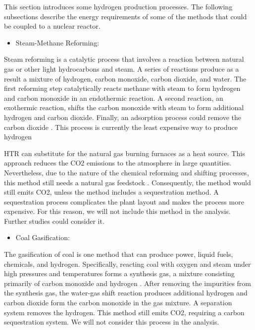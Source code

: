 \documentclass[11pt,letterpaper]{article}
\begin{document}
This section introduces some hydrogen production processes.
The following subsections describe the energy requirements of some of the methods that could be coupled to a nuclear reactor.

\begin{itemize}
	\item Steam-Methane Reforming:
\end{itemize}

Steam reforming is a catalytic process that involves a reaction between natural gas or other light hydrocarbons and steam.
A series of reactions produce as a result a mixture of hydrogen, carbon monoxide, carbon
dioxide, and water.
The first reforming step catalytically reacts methane with steam to form hydrogen and carbon monoxide in an endothermic reaction.
A second reaction, an exothermic reaction, shifts the carbon monoxide with steam to form additional hydrogen and carbon dioxide.
Finally, an adsorption process could remove the carbon dioxide \cite{harper_us_2012}.
This process is currently the least expensive way to produce hydrogen \cite{doe_office_of_energy_efficiency_and_renewable_energy_hydrogen_2020}

\gls{HTR} can substitute for the natural gas burning furnaces as a heat source.
This approach reduces the \gls{CO2} emissions to the atmosphere in large quantities.
Nevertheless, due to the nature of the chemical reforming and shifting processes, this method still needs a natural gas feedstock \cite{yildiz_efficiency_2006}. 
Consequently, the method would still emits \gls{CO2}, unless the method includes a sequestration method.
A sequestration process complicates the plant layout and makes the process more expensive.
For this reason, we will not include this method in the analysis.
Further studies could consider it.

\begin{itemize}
	\item Coal Gasification:
\end{itemize}

The gasification of coal is one method that can produce power, liquid fuels, chemicals, and hydrogen.
Specifically, reacting coal with oxygen and steam under high pressures and temperatures forms a synthesis gas, a mixture consisting primarily of carbon monoxide and hydrogen \cite{doe_office_of_energy_efficiency_and_renewable_energy_hydrogen_2020}.
After removing the impurities from the synthesis gas, the water-gas shift reaction produces additional hydrogen and carbon dioxide form the carbon monoxide in the gas mixture.
A separation system removes the hydrogen.
This method still emits \gls{CO2}, requiring a carbon sequestration system. 
We will not consider this process in the analysis.
\end{document}
